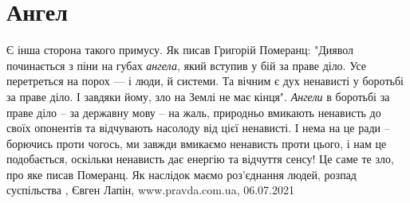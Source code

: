  
 
 
 
 
\chapter{Ангел}

Є інша сторона такого примусу. Як писав Григорій Померанц: "Диявол починається
з піни на губах \emph{ангела}, який вступив у бій за праве діло. Усе
перетреться на порох — і люди, й системи. Та вічним є дух ненависті у боротьбі
за праве діло. І завдяки йому, зло на Землі не має кінця".  \emph{Ангели} в
боротьбі за праве діло – за державну мову – на жаль, природньо вмикають
ненависть до своїх опонентів та відчувають насолоду від цієї ненависті.  І нема
на це ради – борючись проти чогось, ми завжди вмикаємо ненависть проти цього, і
нам це подобається, оскільки ненависть дає енергію та відчуття сенсу!  Це саме
те зло, про яке писав Померанц.  Як наслідок маємо роз’єднання людей, розпад
суспільства
, 
Євген Лапін, www.pravda.com.ua, 06.07.2021
